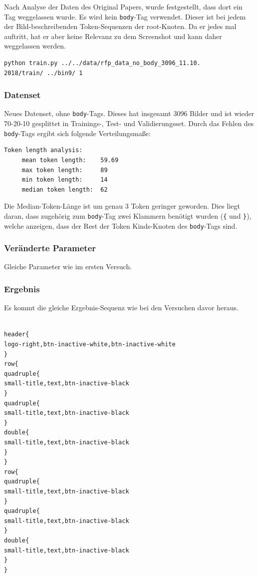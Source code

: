 \documentclass[pdftex,a4paper,halfparskip, article]{scrartcl}
\begin{document}
Nach Analyse der Daten des Original Papers, wurde festgestellt, dass dort ein Tag weggelassen wurde. Es wird kein \texttt{body}-Tag verwendet. Dieser ist bei jedem der Bild-beschreibenden Token-Sequenzen der root-Knoten. Da er jedes mal auftritt, hat er aber keine Relevanz zu dem Screenshot und kann daher weggelassen werden.

\begin{verbatim}
python train.py ../../data/rfp_data_no_body_3096_11.10.
2018/train/ ../bin9/ 1

\end{verbatim}

\subsubsection*{Datenset}

Neues Datenset, ohne \texttt{body}-Tags. Dieses hat insgesamt 3096 Bilder und ist wieder 70-20-10 gesplittet in Trainings-, Test- und Validierungsset. Durch das Fehlen des \texttt{body}-Tags ergibt sich folgende Verteilungsmaße:
\begin{verbatim}
Token length analysis:
     mean token length:    59.69
     max token length:     89
     min token length:     14
     median token length:  62
\end{verbatim}

Die Median-Token-Länge ist um genau 3 Token geringer geworden. Dies liegt daran, dass zugehörig zum \texttt{body}-Tag zwei Klammern benötigt wurden (\texttt{\{} und \texttt{\}}), welche anzeigen, dass der Rest der Token Kinds-Knoten des \texttt{body}-Tags sind.

\subsubsection*{Veränderte Parameter}

Gleiche Parameter wie im ersten Versuch.

\subsubsection*{Ergebnis}

Es kommt die gleiche Ergebnis-Sequenz wie bei den Versuchen davor heraus.

\begin{verbatim}

header{
logo-right,btn-inactive-white,btn-inactive-white
}
row{
quadruple{
small-title,text,btn-inactive-black
}
quadruple{
small-title,text,btn-inactive-black
}
double{
small-title,text,btn-inactive-black
}
}
row{
quadruple{
small-title,text,btn-inactive-black
}
quadruple{
small-title,text,btn-inactive-black
}
double{
small-title,text,btn-inactive-black
}
}

\end{verbatim}
\end{document}
